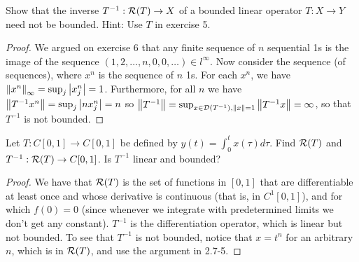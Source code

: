 \begin{exercise}{8}
Show that the inverse $T^{-1}:\mathcal{R}(T)\to X$ of a bounded linear operator $T:X\to Y$ need not be bounded. 
Hint: Use $T$ in exercise 5.
\end{exercise}
\begin{proof}
We argued on exercise 6 that any finite sequence of $n$ sequential 1s is the image of the sequence $(1,2,\dots,n,0,0,\dots)\in l^\infty$.
Now consider the sequence (of sequences), where $x^n$ is the sequence of $n$ 1s.
For each $x^n$, we have $\left\lVert x^n\right\rVert_\infty=\sup_j\left\lvert x^n_j\right\rvert=1$.
Furthermore, for all $n$ we have $\left\lVert T^{-1}x^n\right\rVert =\sup_j\left\lvert nx^n_j\right\rvert =n$ so
$\left\lVert T^{-1}\right\rVert=\sup_{x\in\mathcal{D}(T^{-1}),\left\lVert x\right\rVert=1}\left\lVert T^{-1}x\right\rVert=\infty$, so that $T^{-1}$ is not bounded.
\end{proof}

\begin{exercise}{9}
Let $T:C[0,1]\to C[0,1]$ be defined by $y(t)=\int_0^t x(\tau)d\tau$. 
Find $\mathcal{R}(T)$ and $T^{-1}:\mathcal{R}(T)\to C[0,1]$. Is $T^{-1}$ linear and bounded?
\end{exercise}
\begin{proof}
We have that $\mathcal{R}(T)$ is the set of functions in $[0,1]$ that are differentiable at least once and whose derivative is continuous (that is, in $C^1[0,1]$), and for which $f(0)=0$ (since whenever we integrate with predetermined limits we don't get any constant).
$T^{-1}$ is the differentiation operator, which is linear but not bounded.
To see that $T^{-1}$ is not bounded, notice that $x=t^n$ for an arbitrary $n$, which is in $\mathcal{R}(T)$, and use the argument in 2.7-5.
\end{proof}

